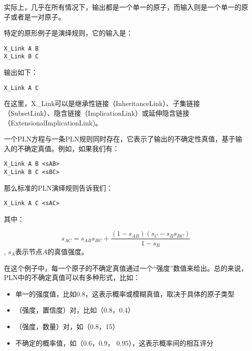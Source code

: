 实际上，几乎在所有情况下，输出都是一个单一的原子，而输入则是一个单一的原子或者是一对原子。

特定的原形例子是演绎规则，它的输入是：

{\tt\begin{small}\begin{lstlisting}
X_Link A B
X_Link B C
\end{lstlisting}\end{small}}

输出如下：

{\tt\begin{small}\begin{lstlisting}
X_Link A C
\end{lstlisting}\end{small}}

在这里，X\_Link可以是继承性链接（InheritanceLink）、子集链接（SubsetLink）、隐含链接（ImplicationLink）或延伸隐含链接（ExtensionalImplicationLink)。

一个PLN方程与一条PLN规则同时存在，它表示了输出的不确定性真值，基于输入的不确定真值。例如，如果我们有：

{\tt\begin{small}\begin{lstlisting}
X_Link A B <sAB>
X_Link B C <sBC>
\end{lstlisting}\end{small}}



那么标准的PLN演绎规则告诉我们：

{\tt\begin{small}\begin{lstlisting}
X_Link A C <sAC>
\end{lstlisting}\end{small}}

其中：

$$
s_{AC}=s_{AB}s_{BC}+\frac{\left(1-s_{AB}\right)\left(s_C-s_Bs_{BC}\right)}{1-s_B}
$$, $s_A$表示节点$A$的真值强度。

在这个例子中，每一个原子的不确定真值通过一个“强度”数值来给出。总的来说，PLN中的不确定真值可以有多种形式，比如：

\begin{itemize}
\item 单一的强度值，比如0.8，这表示概率或模糊真值，取决于具体的原子类型
\item （强度，置信度）对，比如（0.8，0.4）
\item （强度，数量）对，如（0.8，15）
\item 不确定的概率值，如（0.6，0.9， 0.95），这表示概率间的相互评分
\end{itemize}

